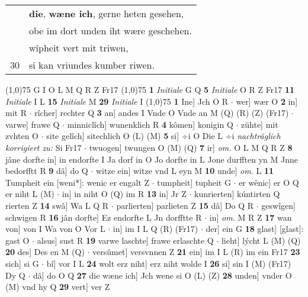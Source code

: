 \documentclass[8pt,a4paper,notitlepage]{article}
\begin{document}
\begin{table}[ht]
\begin{minipage}[t]{0.5\linewidth}
\begin{tabular}{rl}
 & \textbf{die}, \textbf{wæne ich}, gerne heten gesehen,\\ 
 & obe im dort unden iht wære geschehen.\\ 
 & wîpheit vert mit triwen,\\ 
30 & si kan vriundes kumber riwen.\\ 
\end{tabular}
\scriptsize
\line(1,0){75} \newline
G I O L M Q R Z Fr17 \newline
\line(1,0){75} \newline
\textbf{1} \textit{Initiale} G Q  \textbf{5} \textit{Initiale} O R Z Fr17  \textbf{11} \textit{Initiale} I L  \textbf{15} \textit{Initiale} M  \textbf{29} \textit{Initiale} I  \newline
\line(1,0){75} \newline
\textbf{1} Ine] Jch O R  $\cdot$ wer] wær O \textbf{2} in] mit R  $\cdot$ rîcher] rechter Q \textbf{3} an] andes I Vnde O Vnde an M (Q) (R) (Z) (Fr17)  $\cdot$ varwe] frawe Q  $\cdot$ minniclîch] wunenklich R \textbf{4} kômen] konigin Q  $\cdot$ zühte] mit zvhten O  $\cdot$ site gelîch] sitechlich O (L) (M) \textbf{5} si] ÷i O Die L ÷i \textit{nachträglich korrigiert zu:} Si Fr17  $\cdot$ twuogen] twungen O (M) (Q) \textbf{7} ir] \textit{om.} O L M Q R Z \textbf{8} jâne dorfte in] in endorfte I Ja dorf in O Jo dorfte in L Jone durfften yn M Jnne bedorfftt R \textbf{9} dâ] do Q  $\cdot$ witze ein] witze vnd L eyn M \textbf{10} unde] \textit{om.} L \textbf{11} Tumpheit ein [weni*]: wenic er engalt Z  $\cdot$ tumpheit] tupheit G  $\cdot$ er wênic] er O Q er niht L (M)  $\cdot$ in] in niht O (Q) im R \textbf{13} in] Jr Z  $\cdot$ kunrierten] kúntirten Q rierten Z \textbf{14} swâ] Wa L Q R  $\cdot$ parlierten] parlieten Z \textbf{15} dâ] Do Q R  $\cdot$ geswîgen] schwigen R \textbf{16} jân dorfte] Ez endorfte L Jn dorfftte R  $\cdot$ in] \textit{om.} M R Z \textbf{17} wan von] von I Wa von O Vor L  $\cdot$ in] im I L Q (R) (Fr17)  $\cdot$ der] ein G \textbf{18} glast] [glast]: gast O  $\cdot$ alsus] sust R \textbf{19} varwe laschte] frawe erlaschte Q  $\cdot$ lieht] lýcht L (M) (Q) \textbf{20} des] Des en M (Q)  $\cdot$ versûmet] versvnnen Z \textbf{21} ein] im I L (R) im ein Fr17 \textbf{23} sich] si G  $\cdot$ bî] vor I L \textbf{24} wolt erz niht] erz niht wolde I \textbf{26} si] sin I (M) (Fr17) Dy Q  $\cdot$ dâ] do O Q \textbf{27} die wæne ich] Jch wene si O (L) (Z) \textbf{28} unden] vnder O (M) vnd hy Q \textbf{29} vert] ver Z \newline
\end{minipage}

\end{table}
\end{document}
